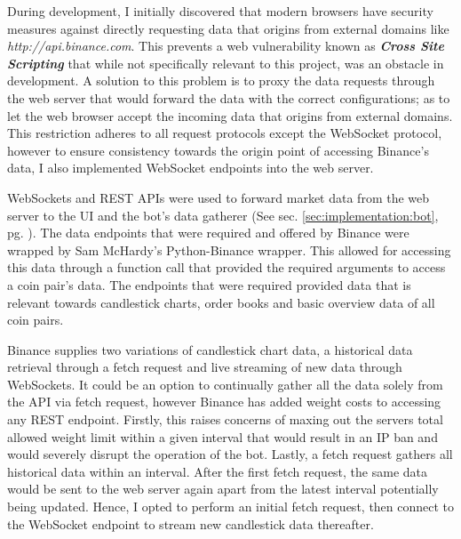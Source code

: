 \noindent During development, I initially discovered that modern browsers have security measures against directly requesting data that origins from external domains like \textit{http://api.binance.com}. This prevents a web vulnerability known as \textit{\textbf{Cross Site Scripting}} that while not specifically relevant to this project, was an obstacle in development. A solution to this problem is to proxy the data requests through the web server that would forward the data with the correct configurations; as to let the web browser accept the incoming data that origins from external domains. This restriction adheres to all request protocols except the WebSocket protocol, however to ensure consistency towards the origin point of accessing Binance's data, I also implemented WebSocket endpoints into the web server.

WebSockets and REST APIs were used to forward market data from the web server to the UI and the bot's data gatherer (See sec. \ref{sec:implementation:bot}, pg. \pageref{sec:implementation:bot}). The data endpoints that were required and offered by Binance were wrapped by Sam McHardy's \cite{MISC:Python-Binance} Python-Binance wrapper. This allowed for accessing this data through a function call that provided the required arguments to access a coin pair's data. The endpoints that were required provided data that is relevant towards candlestick charts, order books and basic overview data of all coin pairs.

Binance supplies two variations of candlestick chart data, a historical data retrieval through a fetch request and live streaming of new data through WebSockets. It could be an option to continually gather all the data solely from the API via fetch request, however Binance has added weight costs to accessing any REST endpoint. Firstly, this raises concerns of maxing out the servers total allowed weight limit within a given interval that would result in an IP ban and would severely disrupt the operation of the bot. Lastly, a fetch request gathers all historical data within an interval. After the first fetch request, the same data would be sent to the web server again apart from the latest interval potentially being updated. Hence, I opted to perform an initial fetch request, then connect to the WebSocket endpoint to stream new candlestick data thereafter. 

